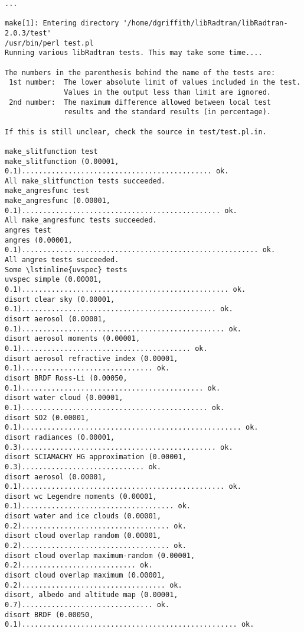 \begin{enumerate}
\begin{lstlisting}[style=tinysize]
...

make[1]: Entering directory '/home/dgriffith/libRadtran/libRadtran-2.0.3/test'
/usr/bin/perl test.pl
Running various libRadtran tests. This may take some time....

The numbers in the parenthesis behind the name of the tests are:
 1st number:  The lower absolute limit of values included in the test.
              Values in the output less than limit are ignored.
 2nd number:  The maximum difference allowed between local test
              results and the standard results (in percentage).

If this is still unclear, check the source in test/test.pl.in.

make_slitfunction test
make_slitfunction (0.00001,   0.1)............................................. ok.
All make_slitfunction tests succeeded.
make_angresfunc test
make_angresfunc (0.00001,   0.1)............................................... ok.
All make_angresfunc tests succeeded.
angres test
angres (0.00001,   0.1)........................................................ ok.
All angres tests succeeded.
Some \lstinline{uvspec} tests
uvspec simple (0.00001,   0.1)................................................. ok.
disort clear sky (0.00001,   0.1).............................................. ok.
disort aerosol (0.00001,   0.1)................................................ ok.
disort aerosol moments (0.00001,   0.1)........................................ ok.
disort aerosol refractive index (0.00001,   0.1)............................... ok.
disort BRDF Ross-Li (0.00050,   0.1)........................................... ok.
disort water cloud (0.00001,   0.1)............................................ ok.
disort SO2 (0.00001,   0.1).................................................... ok.
disort radiances (0.00001,   0.3).............................................. ok.
disort SCIAMACHY HG approximation (0.00001,   0.3)............................. ok.
disort aerosol (0.00001,   0.1)................................................ ok.
disort wc Legendre moments (0.00001,   0.1).................................... ok.
disort water and ice clouds (0.00001,   0.2)................................... ok.
disort cloud overlap random (0.00001,   0.2)................................... ok.
disort cloud overlap maximum-random (0.00001,   0.2)........................... ok.
disort cloud overlap maximum (0.00001,   0.2).................................. ok.
disort, albedo and altitude map (0.00001,   0.7)............................... ok.
disort BRDF (0.00050,   0.1)................................................... ok.

\end{lstlisting}
\end{enumerate}
